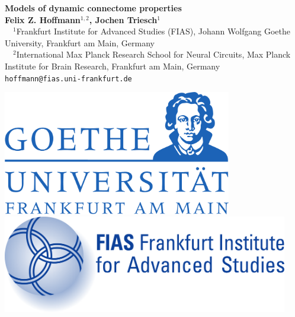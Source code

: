 \documentclass[a0,portrait]{a0poster}
\begin{document}

\vspace{-5cm}

\begin{minipage}[b]{0.75\linewidth}
  \veryHuge \textbf{Models of dynamic connectome properties} \color{Black}\\[1.5cm] 
  \huge \textbf{Felix Z. Hoffmann$^{1,2}$, Jochen Triesch$^1$}\\[0.5cm] %
\large $\quad ^1$Frankfurt Institute for Advanced Studies (FIAS), Johann Wolfgang Goethe University, Frankfurt am Main, Germany\\[0.2cm] %
$\quad ^2$International Max Planck Research School for Neural Circuits, Max Planck Institute for Brain Research, Frankfurt am Main, Germany\\[0.4cm]
\Large \texttt{hoffmann@fias.uni-frankfurt.de}\\
\end{minipage}
%
\begin{minipage}[b]{0.25\linewidth}
  \centering
  
  \includegraphics[width=10cm]{goethe-logo.pdf}\\
  \vspace{2.8cm}
  \includegraphics[width=12.5cm]{FIAS-logo.pdf}\\
  \vspace{2cm}
  
\end{minipage}
\end{document}

